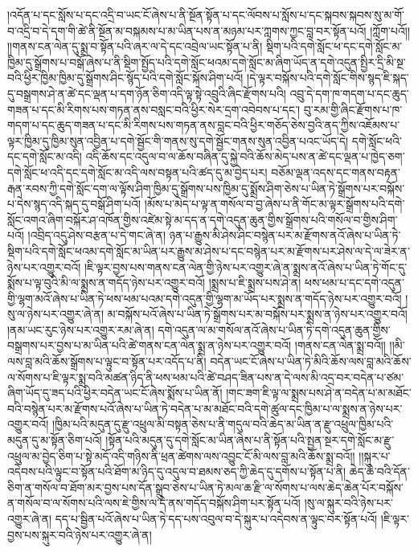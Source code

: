 །འདོན་པ་དང་སློས་པ་དང་འདྲི་བ་ཡང་ངོ་ཞེས་པ་ནི་སྔོན་སྟོན་པ་དང་ལོབས་པ་སློས་པ་དང་སྐབས་སྐབས་སུ་མ་གོ་བ་འདྲི་བ་དེ་དག་གི་ཚེ་ནི་སྔོན་མ་བསྐམས་པ་མ་ཡིན་པས་ན་མཉམ་པར་ཀླགས་ཀྱང་བླ་བར་སྟོན་པའོ། །ཀློག་པའོ།། །།གནས་ངན་ལེན་དུ་སྨྲ་བ་སྟོན་པའི་ཞར་ལ་དེ་དང་འབྲེལ་ཡང་སྟོན་པ་ནི། སྡིག་པའི་དགེ་སློང་ཕ་དང་དགེ་སློང་མ་ཁྱིམ་དུ་སྒྲོགས་པ་བསྒོ་ཞེས་པ་ནི་སྡིག་སྤྱོད་པའི་དགེ་སློང་ཕའམ་དགེ་སློང་མ་ཞིག་ཡོད་ན་དགེ་འདུན་སྤྱིར་དྲི་མི་སྔ་བའི་ཕྱིར་ཁྱིམ་ཁྱིམ་དུ་སྒྲོགས་ཤིང་སྙོད་པའི་དགེ་སློང་སྐོས་ཤིག་པའོ། །དེ་ལྟར་བསྐོས་པའི་དགེ་སློང་གིས་སྙད་ཇི་སྐད་དུ་བསྒྲགས་ཤེ་ན་ཚེ་དང་ལྡན་པ་དག་ཉོན་ཅིག་འདི་ལྟ་སྟེ་འབྲུའི་ཞིང་རྫོགས་པའི། འབྲུ་དེ་དག་ཁ་གདག་པ་དང་ཆུད་གཟན་པ་དང་མི་རིགས་པས་གཏན་ནས་བསླང་བའི་ཕྱིར་སེར་དྲག་འབེབས་པ་དང་། བུ་རམ་གྱི་ཞིང་རྫོགས་པ་ཁ་གདག་པ་དང་ཆུད་གཟན་པ་དང་མི་རིགས་པས་གཏན་ནས་བླང་བའི་ཕྱིར་གཅོད་ཅེས་བྱའི་ནད་ཀྱིས་འཇོམས་པ་ལྟར་ཁྱིམ་དུ་ཁྱིམ་སུན་འབྱིན་པ་དགེ་སྦྱོང་གི་གནས་སུ་དགེ་སྦྱོང་གནས་སུན་འབྱིན་པའང་ཡོད་དེ། དགེ་སློང་ཕའི་དང་དགེ་སློང་མ་འདི། འདི་ཆོས་དང་འདུལ་བ་ལ་ཆོས་བཞིན་དུ་སྐྱེ་བའི་ཆོས་མེད་པས་ན་ཚེ་དང་ལྡན་པ་ཁྱེད་ཅག་དགེ་སློང་ཕ་འདི་དང་དགེ་སློང་མ་འདི་ལས་བསྟན་པའི་ཚད་དུ་མ་བྱེད་པར། བཅོམ་ལྡན་འདས་དང་གནས་བརྟན་རྒན་རབས་ཀྱི་དགེ་སློང་དག་ལ་ལྟོས་ཤིག་ཁྱིམ་དུ་སྒྲོགས་པས་ཁྱིམ་དུ་སྨྲོས་ཤིག་ཅེས་པ་ཡིན་ཏེ་སྒྲོགས་པར་བསྐོས་པ་དེས་སྙད་འདི་སྐད་དུ་བསྒོ་ཤིག་པའོ། །མོས་པ་མེད་པ་ལྟ་ན་གསོལ་བ་བྱ་ཞེས་པ་ནི་གོང་མ་ལྟར་སྒྲོགས་པའི་དགེ་སློང་འགའ་ཞིག་བསྐོར་ཤ་འཁོན་གྱིས་འཛེམ་སྟེ་མ་དད་ན་དགེ་འདུན་ཆུན་གྱིས་སྒྲོགས་པའི་གསོལ་བ་གྱིས་ཤིག་པའོ། །འབྲིད་འདུ་ཤེས་བརྩན་པ་དེ་གང་ཞེ་ན། ཉན་པ་རྒྱུས་མི་ཤེས་ཤིང་བསྙེན་པར་མ་རྫོགས་ནའོ་ཞེས་པ་ཡིན་ཏེ་སྡིག་པའི་དགེ་སློང་ཕའམ་དགེ་སློང་མ་ཡིན་པར་རྒྱུས་མ་ཤེས་པ་དང་བསྙེན་པར་མ་རྫོགས་པར་ཤེས་ལ་དེ་ལ་ཟེར་ན་ཉེས་པར་འགྱུར་བའོ། །ཇི་ལྟར་བྱས་པས་གནས་ངན་ལེན་གྱི་ཉེས་པར་འགྱུར་ཞེ་ན་སྨྲས་ནའོ་ཞེས་པ་ཡིན་ཏེ་གོང་དུ་སྨོས་པ་ལྟ་བུའི་མི་ལ་སྨྲས་ན་གདོད་ཉེས་པར་འགྱུར་བའོ། །སྨྲས་པ་ཇི་སྨྲས་པས་ཤེ་ན། ཕས་ཕམ་པ་དང་དགེ་འདུན་གྱི་ལྷག་མའོ་ཞེས་པ་ཡིན་ཏེ་ཕས་ཕམ་པའམ་དགེ་འདུན་གྱི་ལྷག་མ་ཡོད་པར་སྨྲས་ན་གདོད་ཉེས་པར་འགྱུར་བའོ། །སུ་ལ་ཉེས་པར་འགྱུར་ཞེ་ན། མ་བསྐོས་པའོ་ཞེས་པ་ཡིན་ཏེ་སྒྲོགས་པར་མ་བསྐོས་པར་སྨྲས་ན་ཉེས་པར་འགྱུར་བའོ། །ནམ་ཡང་རུང་ཉེས་པར་འགྱུར་རམ་ཞེ་ན། དགེ་འདུན་ལ་མ་གསོལ་ནའོ་ཞེས་པ་ཡིན་ཏེ་དགེ་འདུན་ཆུན་གྱིས་བསྒྲགས་པར་བྱས་པ་མ་ཡིན་པའི་ཚེ་གནས་ངན་ལེན་སྨྲ་ན་ཉེས་པར་འགྱུར་བའོ། །གནས་ངན་ལེན་སྨྲ་བའོ།། །།མི་ལས་བླ་མའི་ཆོས་སྒྲོགས་པ་ལྟུང་བ་སྟོན་པར་འདོད་པ་ནི། བདེན་ཡང་ངོ་ཞེས་པ་ཡིན་ཏེ་མིའི་ཆོས་ལས་བླ་མའི་ཆོས་ལ་སོགས་པ་ཇི་ལྟར་སྨྲ་བའི་མཚན་ཉིད་ནི་ཕས་ཕམ་པའི་ཚེ་བཤད་ཟིན་པས་ན་དེ་ལས་མི་འདྲ་བར་བདེན་པ་ཙམ་ཞིག་ཡོད་དུ་ཟད་པའི་ཕྱིར་བདེན་ཡང་ངོ་ཞེས་སྨོས་པ་ཡིན་ནོ། །གང་ཟག་ཇི་ལྟ་ལ་སྨྲས་པས་ཤེ་ན་བདེན་པ་མ་མཐོང་བའི་བསྙེན་པར་མ་རྫོགས་པའོ་ཞེས་པ་ཡིན་ཏེ་བདེན་པ་མ་མཐོང་བའི་དགེ་ཚུལ་དང་ཁྱིམ་པ་ལ་སྨྲས་ན་ཉེས་པར་འགྱུར་བའོ། །ཁྱིམ་པའི་མདུན་དུ་རྫུ་འཕྲུལ་མི་བསྟན་ཅེས་པ་ནི་གདུལ་བའི་ཆེད་མ་ཡིན་ན་རྫུ་འཕྲུལ་ཁྱིམ་པའི་མདུན་དུ་མ་སྟོན་ཅིག་པའོ། །སྟོན་པའི་མདུན་དུ་དགེ་སློང་མ་ཡིན་ཞེས་པ་ནི་སྟོན་པའི་སྤྱན་སྔར་དགེ་སློང་མ་རྫུ་འཕྲུལ་མ་བྱེད་ཅིག་པ་སྟེ་མདོ་འདི་གཉིས་ནི་ཕྲན་ཚེགས་ལས་འབྱུང་ངོ་མི་ལས་བླ་མའི་ཆོས་སྨྲ་བའོ།། །།སྐུར་པ་འདེབས་པའི་ལྟུང་བ་སྟོན་པའི་ཐོག་མ་ཉིད་དུ་འདུལ་བ་ཐམས་ཅད་ཀྱི་ཆེད་དུ་དགོས་པ་སྟོན་པ་ནི། ཆེད་ཆེ་བའི་དོན་ཅིག་ན་གསོལ་བ་ཐོག་མར་བྱས་པས་དོན་སྒྲུབ་ཅེས་པ་ཡིན་ཏེ་མལ་ཆ་རྫི་ལ་སོགས་པ་ལས་ཆེད་ཆེན་པོར་བསྐོས་ན་གསོལ་བ་ལ་སོགས་པའི་ལས་ཇེ་གྱིས་ལ་དེ་ནས་གདོད་བསྐོས་ཤིག་པར་སྟོན་པའོ། །སུ་ལ་སྐུར་བའི་ཉེས་པར་འགྱུར་ཞེ་ན། དད་པ་སྦྱིན་པའོ་ཞེས་པ་ཡིན་ཏེ་དད་པས་འབུལ་བ་དེ་སྐུར་པ་འདེབས་ན་ལྟུང་བར་སྟོན་པའོ། །ཇི་ལྟར་བྱས་པས་སྐུར་བའི་ཉེས་པར་འགྱུར་ཞེ་ན། 